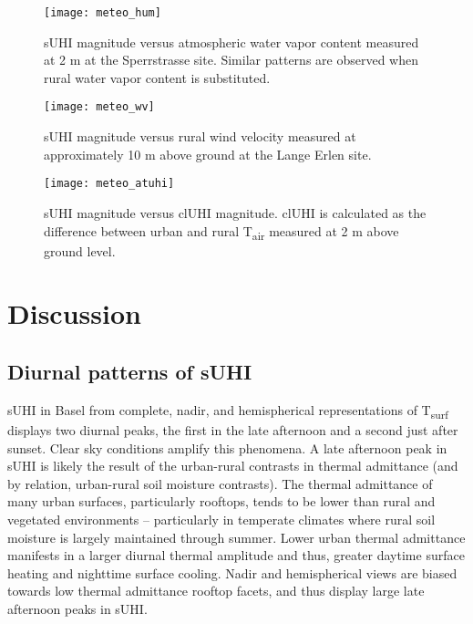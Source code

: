 \begin{bibunit}
\begin{figure}[H]
	\centering
	\texttt{[image: meteo\_hum]}
	\caption{sUHI magnitude versus atmospheric water vapor content measured at 2 \si{\meter} at the Sperrstrasse site. Similar patterns are observed when rural water vapor content is substituted.}
	\label{meteo_hum}
\end{figure}

\begin{figure}[H]
	\centering
	\texttt{[image: meteo\_wv]}
	\caption{sUHI magnitude versus rural wind velocity measured at approximately 10 \si{\meter} above ground at the Lange Erlen site.}
	\label{meteo_wv}
\end{figure}

\begin{figure}[H]
	\centering
	\texttt{[image: meteo\_atuhi]}
	\caption{sUHI magnitude versus clUHI magnitude. clUHI is calculated as the difference between urban and rural T\textsubscript{air} measured at 2 \si{\meter} above ground level.}
	\label{meteo_atuhi}
\end{figure}

\section{Discussion}

\subsection{Diurnal patterns of sUHI}

sUHI in Basel from complete, nadir, and hemispherical representations of T\textsubscript{surf} displays two diurnal peaks, the first in the late afternoon and a second just after sunset. Clear sky conditions amplify this phenomena. A late afternoon peak in sUHI is likely the result of the urban-rural contrasts in thermal admittance (and by relation, urban-rural soil moisture contrasts). The thermal admittance of many urban surfaces, particularly rooftops, tends to be lower than rural and vegetated environments \citep{Spronken-Smith1998} – particularly in temperate climates where rural soil moisture is largely maintained through summer. Lower urban thermal admittance manifests in a larger diurnal thermal amplitude and thus, greater daytime surface heating and nighttime surface cooling. Nadir and hemispherical views are biased towards low thermal admittance rooftop facets, and thus display large late afternoon peaks in sUHI.


\end{bibunit}
